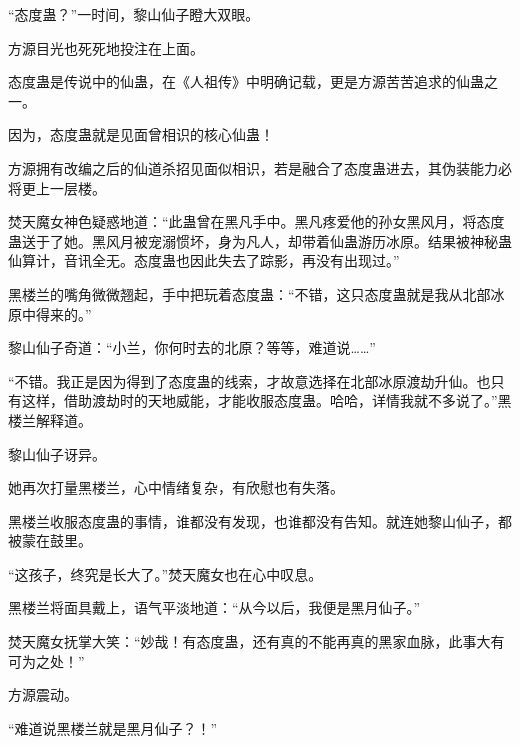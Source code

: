 \begin{this_body}
“态度蛊？”一时间，黎山仙子瞪大双眼。

方源目光也死死地投注在上面。

态度蛊是传说中的仙蛊，在《人祖传》中明确记载，更是方源苦苦追求的仙蛊之一。

因为，态度蛊就是见面曾相识的核心仙蛊！

方源拥有改编之后的仙道杀招见面似相识，若是融合了态度蛊进去，其伪装能力必将更上一层楼。

焚天魔女神色疑惑地道：“此蛊曾在黑凡手中。黑凡疼爱他的孙女黑风月，将态度蛊送于了她。黑风月被宠溺惯坏，身为凡人，却带着仙蛊游历冰原。结果被神秘蛊仙算计，音讯全无。态度蛊也因此失去了踪影，再没有出现过。”

黑楼兰的嘴角微微翘起，手中把玩着态度蛊：“不错，这只态度蛊就是我从北部冰原中得来的。”

黎山仙子奇道：“小兰，你何时去的北原？等等，难道说……”

“不错。我正是因为得到了态度蛊的线索，才故意选择在北部冰原渡劫升仙。也只有这样，借助渡劫时的天地威能，才能收服态度蛊。哈哈，详情我就不多说了。”黑楼兰解释道。

黎山仙子讶异。

她再次打量黑楼兰，心中情绪复杂，有欣慰也有失落。

黑楼兰收服态度蛊的事情，谁都没有发现，也谁都没有告知。就连她黎山仙子，都被蒙在鼓里。

“这孩子，终究是长大了。”焚天魔女也在心中叹息。

黑楼兰将面具戴上，语气平淡地道：“从今以后，我便是黑月仙子。”

焚天魔女抚掌大笑：“妙哉！有态度蛊，还有真的不能再真的黑家血脉，此事大有可为之处！”

方源震动。

“难道说黑楼兰就是黑月仙子？！”

\end{this_body}

